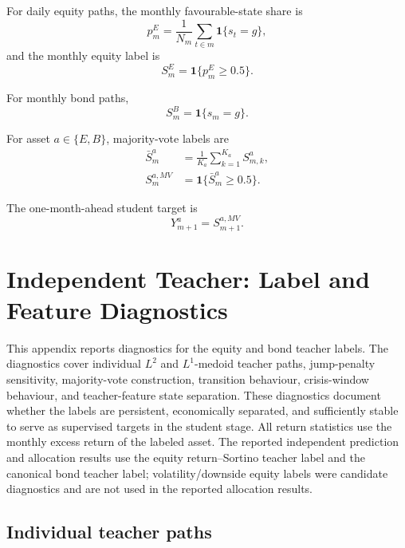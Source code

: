 For daily equity paths, the monthly favourable-state share is
\begin{equation}
p^{E}_m
=
\frac{1}{N_m}
\sum_{t\in m}
\mathbf{1}\{s_t=g\},
\end{equation}
and the monthly equity label is
\begin{equation}
S^{E}_m
=
\mathbf{1}\{p^{E}_m\geq 0.5\}.
\end{equation}

For monthly bond paths,
\begin{equation}
S^{B}_m
=
\mathbf{1}\{s_m=g\}.
\end{equation}

For asset \(a\in\{E,B\}\), majority-vote labels are
\begin{align}
\bar{S}^{a}_m
&=
\frac{1}{K_a}
\sum_{k=1}^{K_a}S^{a}_{m,k}, \\
S^{a,MV}_m
&=
\mathbf{1}\{\bar{S}^{a}_m\geq 0.5\}.
\end{align}

The one-month-ahead student target is
\begin{equation}
Y^a_{m+1}
=
S^{a,MV}_{m+1}.
\end{equation}

\section{Independent Teacher: Label and Feature Diagnostics}
\label{app:teacher-label-diagnostics}

This appendix reports diagnostics for the equity and bond teacher labels. The diagnostics
cover individual $L^2$ and $L^1$-medoid teacher paths, jump-penalty sensitivity,
majority-vote construction, transition behaviour, crisis-window behaviour, and teacher-feature
state separation. These diagnostics document whether the labels are persistent,
economically separated, and sufficiently stable to serve as supervised targets in the
student stage. All return statistics use the monthly excess return of the labeled asset.
The reported independent prediction and allocation results use the equity return--Sortino
teacher label and the canonical bond teacher label; volatility/downside equity labels were
candidate diagnostics and are not used in the reported allocation results.

\subsection{Individual teacher paths}
\label{app:teacher-individual-paths}

